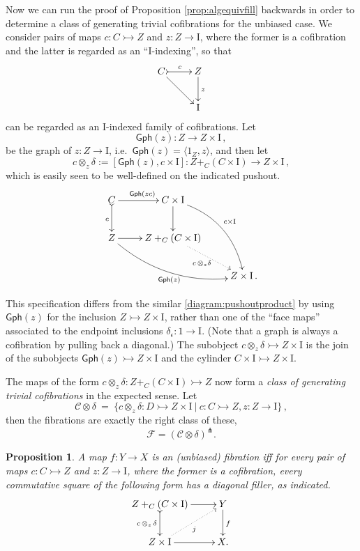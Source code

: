 \documentclass[11pt]{article}
\newcommand{\mono}{\ensuremath{\rightarrowtail}}
\newcommand{\ra}{\ensuremath{\rightarrow}}
\newcommand{\I}{\ensuremath{\mathrm{I}}}
\newtheorem{proposition}[theorem]{Proposition}
\theoremstyle{remark}
\theoremstyle{definition}
\begin{document}
Now we can run the proof of Proposition \ref{prop:algequivfill} backwards in order to determine a class of generating trivial cofibrations for the unbiased case. We consider pairs of maps $c : C\mono Z$ and $z:Z\to\I$, where the former is a cofibration and the latter is regarded as an ``$\I$-indexing'', so that
\[
\xymatrix{
C \ar[rd] \ar@{>->}[r]^{c} & Z  \ar[d]^z \\
& \I
}
\]
can be regarded as an $\I$-indexed family of cofibrations.  Let 
\[
\mathsf{Gph}(z) : Z\to Z\times\I\,,
\]
be the graph of $z : Z\to \I$, i.e.\ $\mathsf{Gph}(z) = \langle 1_Z, z\rangle$, and then let
\[
c \otimes_z\!\delta := [\mathsf{Gph}(z), c\times\I] : Z+_C(C\times\I) \to Z\times \I\,,
\]
which is easily seen to be well-defined on the indicated pushout.
\begin{equation}\label{diagram:unbiasedpushoutproduct}
\xymatrix{
C \ar@{>->}[d]_{c} \ar[r]^{\mathsf{Gph}(zc)} & C\times \I \ar[d] \ar@/^4ex/ [rdd]^{c\times\I}\\
Z \ar@/_4ex/ [rrd]_{\mathsf{Gph}(z)} \ar[r] &  Z +_C (C\times\I) \ar@{.>}[rd]_{c\, \otimes_z \delta} \\
&& Z\times\I\,.
}
\end{equation}

This specification differs from the similar \eqref{diagram:pushoutproduct} by using $\mathsf{Gph}(z)$ for the inclusion $Z\mono Z\times\I$, rather than one of the ``face maps'' associated to the endpoint inclusions $\delta_\epsilon : 1\to\I$. (Note that a graph is always a cofibration by pulling back a diagonal.)  The subobject $c \otimes_z\!\delta \mono Z\times \I$ is the join of the subobjects $\mathsf{Gph}(z) \mono Z\times \I$ and the cylinder $C\times \I \mono Z\times \I$.

The maps of the form $c\otimes_z\delta : Z +_C (C\times\I) \mono Z$  now form a \emph{class of generating trivial cofibrations} in the expected sense.  Let 
\begin{equation}\label{eq:generatingtrivialcofibrations}
\mathcal{C}\otimes\delta\ =\ \{ c \otimes_z \delta : D \mono Z \times \I\ |\ c : C\mono Z, z:Z\to\I \}\,,
\end{equation}
then the fibrations are exactly the right class of these,
\[
\mathcal{F} = (\mathcal{C}\otimes\delta)^{\pitchfork}.
\]
\begin{proposition}\label{prop:fibiffrlp}
A map $f: Y\ra X$ is an (unbiased) fibration iff for every pair of maps $c : C\mono Z$ and $z:Z\ra\I$, where the former is a cofibration, every commutative square of the following form has a diagonal filler, as indicated.
\begin{equation}\label{diagram:unbiasedfibration}
\xymatrix{
Z +_C (C\times\I) \ar@{>->}[d]_{c\, \otimes_z\, \delta} \ar[r] & Y \ar[d]^f \\
Z\times \I \ar@{.>}[ru]_{j} \ar[r] & X.
}
\end{equation}
\end{proposition}
\end{document}
